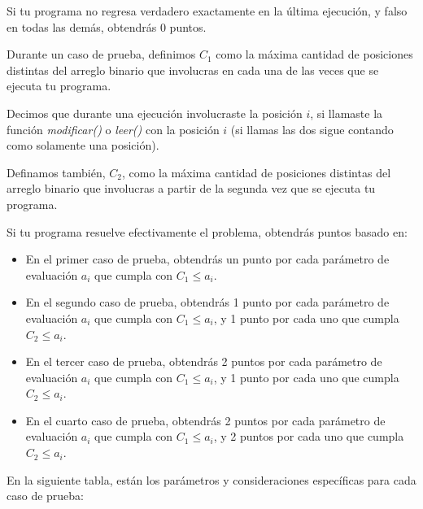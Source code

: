 \documentclass[12pt]{scrartcl}
\begin{document}
        Si tu programa no regresa verdadero exactamente en la última ejecución, y falso en todas las demás, obtendrás 0 puntos.

        Durante un caso de prueba, definimos $C_1$ como la máxima cantidad de posiciones distintas del arreglo binario que involucras en cada una de las veces que se ejecuta tu programa. 
        
        Decimos que durante una ejecución involucraste la posición $i$, si llamaste la función {\itshape modificar()} o {\itshape leer()} con la posición $i$ (si llamas las dos sigue contando como solamente una posición). 
        
        Definamos también, $C_2$, como la máxima cantidad de posiciones distintas del arreglo binario que involucras a partir de la segunda vez que se ejecuta tu programa.
        
        Si tu programa resuelve efectivamente el problema, obtendrás puntos basado en:
        
        
        \begin{itemize}
            \item En el primer caso de prueba, obtendrás un punto por cada parámetro de evaluación $a_i$ que cumpla con $C_1 \le a_i$.
            \item En el segundo caso de prueba, obtendrás 1 punto por cada parámetro de evaluación $a_i$ que cumpla con $C_1 \le a_i$, y 1 punto por cada uno que cumpla $C_2 \le a_i$.
            \item En el tercer caso de prueba, obtendrás 2 puntos por cada parámetro de evaluación $a_i$ que cumpla con $C_1 \le a_i$, y 1 punto por cada uno que cumpla $C_2 \le a_i$.
            \item En el cuarto caso de prueba, obtendrás 2 puntos por cada parámetro de evaluación $a_i$ que cumpla con $C_1 \le a_i$, y 2 puntos por cada uno que cumpla $C_2 \le a_i$.
            
        \end{itemize}


        En la siguiente tabla, están los parámetros y consideraciones específicas para cada caso de prueba:
        
        \null
        
\end{document}
